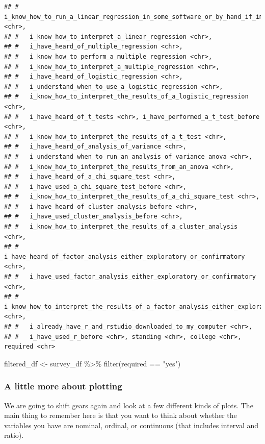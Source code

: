 \documentclass[
]{book}
\newenvironment{Shaded}{\begin{snugshade}}{\end{snugshade}}
\newcommand{\FunctionTok}[1]{\textcolor[rgb]{0.00,0.00,0.00}{#1}}
\newcommand{\NormalTok}[1]{#1}
\newcommand{\OtherTok}[1]{\textcolor[rgb]{0.56,0.35,0.01}{#1}}
\newcommand{\SpecialCharTok}[1]{\textcolor[rgb]{0.00,0.00,0.00}{#1}}
\newcommand{\StringTok}[1]{\textcolor[rgb]{0.31,0.60,0.02}{#1}}
\begin{document}
\begin{verbatim}
## #   i_know_how_to_run_a_linear_regression_in_some_software_or_by_hand_if_im_feeling_wild <chr>,
## #   i_know_how_to_interpret_a_linear_regression <chr>,
## #   i_have_heard_of_multiple_regression <chr>,
## #   i_know_how_to_perform_a_multiple_regression <chr>,
## #   i_know_how_to_interpret_a_multiple_regression <chr>,
## #   i_have_heard_of_logistic_regression <chr>,
## #   i_understand_when_to_use_a_logistic_regression <chr>,
## #   i_know_how_to_interpret_the_results_of_a_logistic_regression <chr>,
## #   i_have_heard_of_t_tests <chr>, i_have_performed_a_t_test_before <chr>,
## #   i_know_how_to_interpret_the_results_of_a_t_test <chr>,
## #   i_have_heard_of_analysis_of_variance <chr>,
## #   i_understand_when_to_run_an_analysis_of_variance_anova <chr>,
## #   i_know_how_to_interpret_the_results_from_an_anova <chr>,
## #   i_have_heard_of_a_chi_square_test <chr>,
## #   i_have_used_a_chi_square_test_before <chr>,
## #   i_know_how_to_interpret_the_results_of_a_chi_square_test <chr>,
## #   i_have_heard_of_cluster_analysis_before <chr>,
## #   i_have_used_cluster_analysis_before <chr>,
## #   i_know_how_to_interpret_the_results_of_a_cluster_analysis <chr>,
## #   i_have_heard_of_factor_analysis_either_exploratory_or_confirmatory <chr>,
## #   i_have_used_factor_analysis_either_exploratory_or_confirmatory <chr>,
## #   i_know_how_to_interpret_the_results_of_a_factor_analysis_either_exploratory_or_confirmatory <chr>,
## #   i_already_have_r_and_rstudio_downloaded_to_my_computer <chr>,
## #   i_have_used_r_before <chr>, standing <chr>, college <chr>, required <chr>
\end{verbatim}

\begin{Shaded}
\begin{Highlighting}[]
\NormalTok{filtered\_df }\OtherTok{\textless{}{-}}\NormalTok{ survey\_df }\SpecialCharTok{\%\textgreater{}\%} \FunctionTok{filter}\NormalTok{(required }\SpecialCharTok{==} \StringTok{"yes"}\NormalTok{)}
\end{Highlighting}
\end{Shaded}

\hypertarget{a-little-more-about-plotting}{%
\subsubsection*{A little more about plotting}\label{a-little-more-about-plotting}}

We are going to shift gears again and look at a few different kinds of plots. The main thing to remember here is that you want to think about whether the variables you have are nominal, ordinal, or continuous (that includes interval and ratio).
\end{document}
